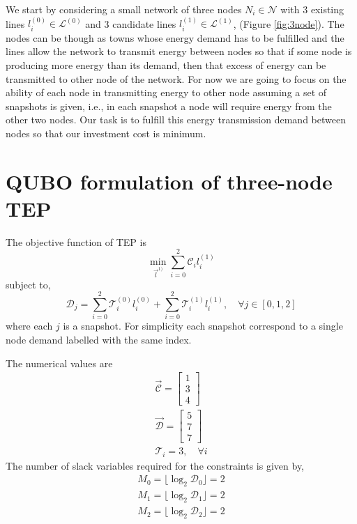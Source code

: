 We start by considering a small network of three nodes $N_{i}\in \mathcal{N}$ with 3 existing lines $l_{i}^{(0)}\in \mathcal{L}^{(0)}$ and 3 candidate lines $l_{i}^{(1)}\in \mathcal{L}^{(1)}$, (Figure \ref{fig:3node}). The nodes can be though as towns whose energy demand has to be fulfilled and the lines allow the network to transmit energy between nodes so that if some node is producing more energy than its demand, then that excess of energy can be transmitted to other node of the network. For now we are going to focus on the ability of each node in transmitting energy to other node assuming a set of snapshots is given, i.e., in each snapshot a node will require energy from the other two nodes. Our task is to fulfill this energy transmission demand between nodes so that our investment cost is minimum.
\section{QUBO formulation of three-node TEP}
The objective function of TEP is
\begin{equation}
    \min_{\vec{l}^{1)}}\sum_{i=0}^{2}\mathcal{C}_{i}l_{i}^{(1)}
\end{equation}
subject to,
\begin{equation}
    \mathcal{D}_{j} = \sum_{i=0}^{2}\mathcal{T}_{i}^{(0)}l_{i}^{(0)} + \sum_{i=0}^{2}\mathcal{T}_{i}^{(1)}l_{i}^{(1)}, \quad \forall j \in \left[0,1,2\right] 
\end{equation}
where each $j$ is a snapshot. For simplicity each snapshot correspond to a single node demand labelled with the same index. \par
The numerical values are
\begin{align}
\vec{\mathcal{C}} =
        \begin{bmatrix}
           1  \\
           3  \\
           4
         \end{bmatrix} \\
\vec{\mathcal{D}} =
        \begin{bmatrix}
           5  \\
           7  \\
           7
         \end{bmatrix} \\
         \mathcal{T}_{i} = 3 , \quad \forall i
\end{align}
The number of slack variables required for the constraints is given by,
\begin{align}
    M_{0} = \lfloor\log_{2}{\mathcal{D}_{0}}\rfloor = 2 \\
    M_{1} = \lfloor\log_{2}{\mathcal{D}_{1}}\rfloor = 2 \\
    M_{2} = \lfloor\log_{2}{\mathcal{D}_{2}}\rfloor = 2
\end{align}
